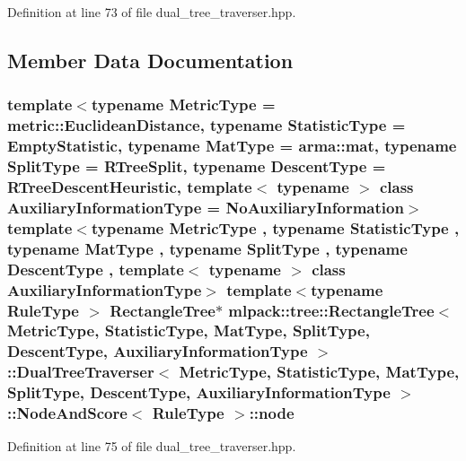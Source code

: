 Definition at line 73 of file dual\+\_\+tree\+\_\+traverser.\+hpp.



\subsection{Member Data Documentation}
\subsubsection[{node}]{\setlength{\rightskip}{0pt plus 5cm}template$<$typename Metric\+Type  = metric\+::\+Euclidean\+Distance, typename Statistic\+Type  = Empty\+Statistic, typename Mat\+Type  = arma\+::mat, typename Split\+Type  = R\+Tree\+Split, typename Descent\+Type  = R\+Tree\+Descent\+Heuristic, template$<$ typename $>$ class Auxiliary\+Information\+Type = No\+Auxiliary\+Information$>$ template$<$typename Metric\+Type , typename Statistic\+Type , typename Mat\+Type , typename Split\+Type , typename Descent\+Type , template$<$ typename $>$ class Auxiliary\+Information\+Type$>$ template$<$typename Rule\+Type $>$ {\bf Rectangle\+Tree}$\ast$ {\bf mlpack\+::tree\+::\+Rectangle\+Tree}$<$ Metric\+Type, Statistic\+Type, Mat\+Type, {\bf Split\+Type}, {\bf Descent\+Type}, Auxiliary\+Information\+Type $>$\+::{\bf Dual\+Tree\+Traverser}$<$ Metric\+Type, Statistic\+Type, Mat\+Type, {\bf Split\+Type}, {\bf Descent\+Type}, Auxiliary\+Information\+Type $>$\+::{\bf Node\+And\+Score}$<$ Rule\+Type $>$\+::node}\label{structmlpack_1_1tree_1_1RectangleTree_1_1DualTreeTraverser_1_1NodeAndScore_afaa9fc6d7d076e1ee99a7c70b5e15885}


Definition at line 75 of file dual\+\_\+tree\+\_\+traverser.\+hpp.

